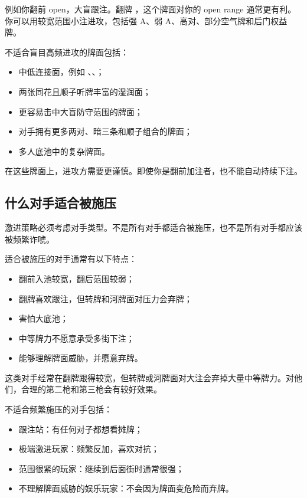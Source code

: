 例如你翻前 open，大盲跟注。翻牌 ，这个牌面对你的 open range 通常更有利。你可以用较宽范围小注进攻，包括强 A、弱 A、高对、部分空气牌和后门权益牌。

不适合盲目高频进攻的牌面包括：

\begin{itemize}
\item 中低连接面，例如 、、；
\item 两张同花且顺子听牌丰富的湿润面；
\item 更容易击中大盲防守范围的牌面；
\item 对手拥有更多两对、暗三条和顺子组合的牌面；
\item 多人底池中的复杂牌面。
\end{itemize}

在这些牌面上，进攻方需要更谨慎。即使你是翻前加注者，也不能自动持续下注。

\subsection{什么对手适合被施压}

激进策略必须考虑对手类型。不是所有对手都适合被施压，也不是所有对手都应该被频繁诈唬。

适合被施压的对手通常有以下特点：

\begin{itemize}
\item 翻前入池较宽，翻后范围较弱；
\item 翻牌喜欢跟注，但转牌和河牌面对压力会弃牌；
\item 害怕大底池；
\item 中等牌力不愿意承受多街下注；
\item 能够理解牌面威胁，并愿意弃牌。
\end{itemize}

这类对手经常在翻牌跟得较宽，但转牌或河牌面对大注会弃掉大量中等牌力。对他们，合理的第二枪和第三枪会有较好效果。

不适合频繁施压的对手包括：

\begin{itemize}
\item 跟注站：有任何对子都想看摊牌；
\item 极端激进玩家：频繁反加，喜欢对抗；
\item 范围很紧的玩家：继续到后面街时通常很强；
\item 不理解牌面威胁的娱乐玩家：不会因为牌面变危险而弃牌。
\end{itemize}

